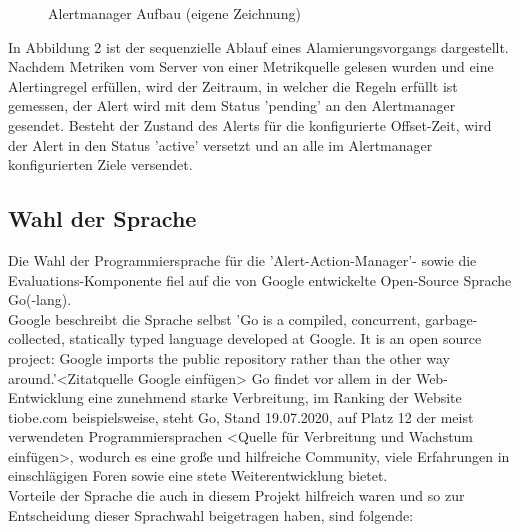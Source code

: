 \documentclass[a4paper,10pt]{scrartcl}
\begin{document}
\begin{figure}[htbp]
  \centering
  \scalebox{.8}{}
  \caption{Alertmanager Aufbau (eigene Zeichnung)}
\end{figure}

In Abbildung 2 ist der sequenzielle Ablauf eines Alamierungsvorgangs dargestellt. Nachdem Metriken vom Server von einer Metrikquelle gelesen wurden und eine Alertingregel erfüllen, wird der Zeitraum, in welcher die Regeln erfüllt ist gemessen, der Alert wird mit dem Status 'pending' an den Alertmanager gesendet. Besteht der Zustand des Alerts für die konfigurierte Offset-Zeit, wird der Alert in den Status 'active' versetzt und an alle im Alertmanager konfigurierten Ziele versendet.

\subsection{Wahl der Sprache}

Die Wahl der Programmiersprache für die 'Alert-Action-Manager'- sowie die Evaluations-Komponente fiel auf die von Google entwickelte Open-Source Sprache Go(-lang).\\
Google beschreibt die Sprache selbst 'Go is a compiled, concurrent, garbage-collected, statically typed language developed at Google. It is an open source project: Google imports the public repository rather than the other way around.'<Zitatquelle Google einfügen>
Go findet vor allem in der Web-Entwicklung eine zunehmend starke Verbreitung, im Ranking der Website tiobe.com beispielsweise, steht Go, Stand 19.07.2020, auf Platz 12 der meist verwendeten Programmiersprachen <Quelle für Verbreitung und Wachstum einfügen>, wodurch es eine große und hilfreiche Community, viele Erfahrungen in einschlägigen Foren sowie eine stete Weiterentwicklung bietet.\\
Vorteile der Sprache die auch in diesem Projekt hilfreich waren und so zur Entscheidung dieser Sprachwahl beigetragen haben, sind folgende:
\end{document}
